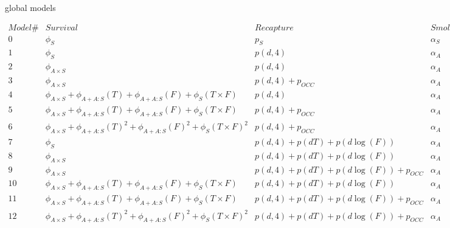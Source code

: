 \documentclass[show notes]{beamer}
\begin{document}
\begin{frame}{global models}

\begin{table}
\begin{center}
$
\begin{array}{lllll}
	Model \# & Survival                                                                          & Recapture                              & Smolting & Emigration \\
	0        & \phi_S                                                                            & p_S                                    & \alpha_S & \rho_S     \\
	1        & \phi_S                                                                            & p(d,4)                                 & \alpha_A & \rho_S     \\
	2        & \phi_{A\times S}                                                                  & p(d,4)                                 & \alpha_A & \rho_S     \\
	3        & \phi_{A\times S}                                                                  & p(d,4) + p_{OCC}                       & \alpha_A & \rho_S     \\
	4        & \phi_{A\times S} + \phi_{A+A:S}(T) + \phi_{A+A:S}(F) + \phi_{S}(T\times F)        & p(d,4)                                 & \alpha_A & \rho_S     \\
	5        & \phi_{A\times S} + \phi_{A+A:S}(T) + \phi_{A+A:S}(F) + \phi_{S}(T\times F)        & p(d,4) + p_{OCC}                       & \alpha_A & \rho_S     \\
	6        & \phi_{A\times S} + \phi_{A+A:S}(T)^2 + \phi_{A+A:S}(F)^2 + \phi_{S}(T \times F)^2 & p(d,4) +  p_{OCC}                      & \alpha_A & \rho_S     \\
	7        & \phi_S                                                                            & p(d,4) + p(dT) + p(d\log(F))           & \alpha_A & \rho_S     \\
	8        & \phi_{A\times S}                                                                  & p(d,4) + p(dT) + p(d\log(F))           & \alpha_A & \rho_S     \\
	9        & \phi_{A\times S}                                                                  & p(d,4) + p(dT) + p(d\log(F)) + p_{OCC} & \alpha_A & \rho_S     \\
	10       & \phi_{A\times S} + \phi_{A+A:S}(T) + \phi_{A+A:S}(F) + \phi_{S}(T\times F)        & p(d,4) + p(dT) + p(d\log(F))           & \alpha_A & \rho_S     \\
	11       & \phi_{A\times S} + \phi_{A+A:S}(T) + \phi_{A+A:S}(F) + \phi_{S}(T\times F)        & p(d,4) + p(dT) + p(d\log(F)) + p_{OCC} & \alpha_A & \rho_S     \\
	12       & \phi_{A\times S} + \phi_{A+A:S}(T)^2 + \phi_{A+A:S}(F)^2 + \phi_{S}(T \times F)^2 & p(d,4) + p(dT) + p(d\log(F)) + p_{OCC} & \alpha_A & \rho_S
\end{array}
$
\end{center}
\end{table}

    
\end{frame}
\end{document}
